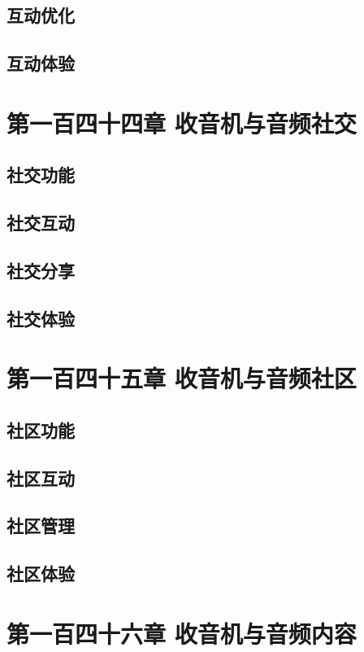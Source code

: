 \documentclass[12pt,UTF8]{ctexbook}
\begin{document}
\section{互动优化}
\section{互动体验}

\chapter{第一百四十四章 收音机与音频社交}

\section{社交功能}
\section{社交互动}
\section{社交分享}
\section{社交体验}

\chapter{第一百四十五章 收音机与音频社区}

\section{社区功能}
\section{社区互动}
\section{社区管理}
\section{社区体验}

\chapter{第一百四十六章 收音机与音频内容}
\end{document}
